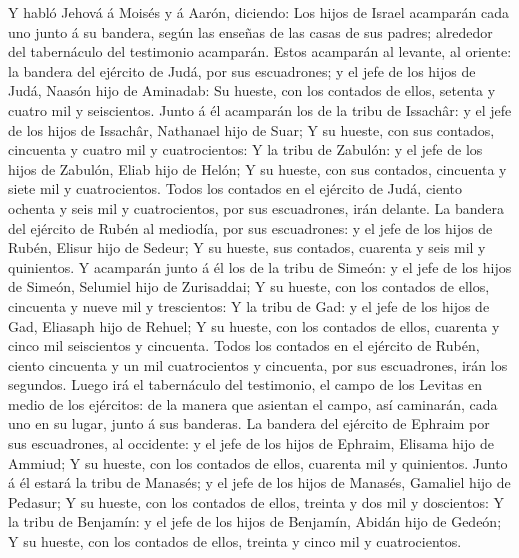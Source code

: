  Y habló Jehová á Moisés y á Aarón, diciendo:
 Los hijos de Israel acamparán cada uno junto á su
bandera, según las enseñas de las casas de sus padres; alrededor del
tabernáculo del testimonio acamparán.  Estos acamparán al
levante, al oriente: la bandera del ejército de Judá, por sus
escuadrones; y el jefe de los hijos de Judá, Naasón hijo de Aminadab:
 Su hueste, con los contados de ellos, setenta y cuatro
mil y seiscientos.  Junto á él acamparán los de la tribu
de Issachâr: y el jefe de los hijos de Issachâr, Nathanael hijo de Suar;
 Y su hueste, con sus contados, cincuenta y cuatro mil y
cuatrocientos:  Y la tribu de Zabulón: y el jefe de los
hijos de Zabulón, Eliab hijo de Helón;  Y su hueste, con
sus contados, cincuenta y siete mil y cuatrocientos. 
Todos los contados en el ejército de Judá, ciento ochenta y seis mil y
cuatrocientos, por sus escuadrones, irán delante.  La
bandera del ejército de Rubén al mediodía, por sus escuadrones: y el
jefe de los hijos de Rubén, Elisur hijo de Sedeur;  Y su
hueste, sus contados, cuarenta y seis mil y quinientos. 
Y acamparán junto á él los de la tribu de Simeón: y el jefe de los hijos
de Simeón, Selumiel hijo de Zurisaddai;  Y su hueste, con
los contados de ellos, cincuenta y nueve mil y trescientos:
 Y la tribu de Gad: y el jefe de los hijos de Gad,
Eliasaph hijo de Rehuel;  Y su hueste, con los contados
de ellos, cuarenta y cinco mil seiscientos y cincuenta. 
Todos los contados en el ejército de Rubén, ciento cincuenta y un mil
cuatrocientos y cincuenta, por sus escuadrones, irán los segundos.
 Luego irá el tabernáculo del testimonio, el campo de los
Levitas en medio de los ejércitos: de la manera que asientan el campo,
así caminarán, cada uno en su lugar, junto á sus banderas.
 La bandera del ejército de Ephraim por sus escuadrones,
al occidente: y el jefe de los hijos de Ephraim, Elisama hijo de Ammiud;
 Y su hueste, con los contados de ellos, cuarenta mil y
quinientos.  Junto á él estará la tribu de Manasés; y el
jefe de los hijos de Manasés, Gamaliel hijo de Pedasur; 
Y su hueste, con los contados de ellos, treinta y dos mil y doscientos:
 Y la tribu de Benjamín: y el jefe de los hijos de
Benjamín, Abidán hijo de Gedeón;  Y su hueste, con los
contados de ellos, treinta y cinco mil y cuatrocientos. 
